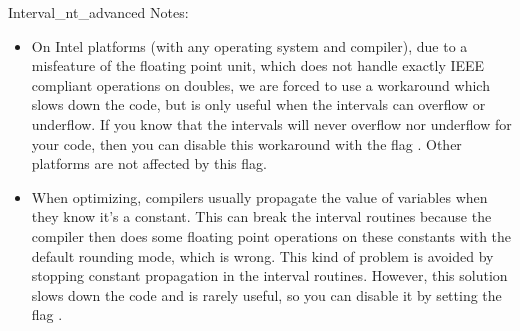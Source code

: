 \begin{ccRefClass} {Interval_nt_advanced}
Notes:\\
\begin{itemize}
\item On Intel platforms (with any operating system and compiler), due to a
      misfeature of the floating point unit, which does not handle exactly
      IEEE compliant operations on doubles, we are forced to use a workaround
      which slows down the code, but is only useful when the intervals can
      overflow or underflow.  If you know that the intervals will never
      overflow nor underflow for your code, then you can disable this
      workaround with the flag .
      Other platforms are not affected by this flag.
\item When optimizing, compilers usually propagate the value of variables when
      they know it's a constant.  This can break the interval routines because
      the compiler then does some floating point operations on these constants
      with the default rounding mode, which is wrong.  This kind of problem
      is avoided by stopping constant propagation in the interval routines.
      However, this solution slows down the code and is rarely useful, so you
      can disable it by setting the flag
      .
\end{itemize}

\end{ccRefClass}
\renewcommand\ccRefPageBegin{}
\renewcommand\ccRefPageEnd{}
